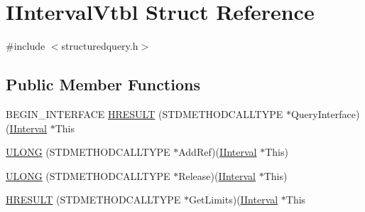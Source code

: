 \hypertarget{struct_i_interval_vtbl}{}\section{I\+Interval\+Vtbl Struct Reference}
\label{struct_i_interval_vtbl}


{\ttfamily \#include $<$structuredquery.\+h$>$}

\subsection*{Public Member Functions}
\begin{DoxyCompactItemize}
\item 
B\+E\+G\+I\+N\+\_\+\+I\+N\+T\+E\+R\+F\+A\+CE \hyperlink{struct_i_interval_vtbl_ae5284e6483cc05e5278e402f5e9ebbb3}{H\+R\+E\+S\+U\+LT} (S\+T\+D\+M\+E\+T\+H\+O\+D\+C\+A\+L\+L\+T\+Y\+PE $\ast$Query\+Interface)(\hyperlink{structuredquery_8h_a0bf098cafe33ebeb06adb20e72b66f27}{I\+Interval} $\ast$This
\item 
\hyperlink{struct_i_interval_vtbl_a5d4627fb8520858570ead80913ca73af}{U\+L\+O\+NG} (S\+T\+D\+M\+E\+T\+H\+O\+D\+C\+A\+L\+L\+T\+Y\+PE $\ast$Add\+Ref)(\hyperlink{structuredquery_8h_a0bf098cafe33ebeb06adb20e72b66f27}{I\+Interval} $\ast$This)
\item 
\hyperlink{struct_i_interval_vtbl_a601f17fa11b1a2e2bdaf538de2699541}{U\+L\+O\+NG} (S\+T\+D\+M\+E\+T\+H\+O\+D\+C\+A\+L\+L\+T\+Y\+PE $\ast$Release)(\hyperlink{structuredquery_8h_a0bf098cafe33ebeb06adb20e72b66f27}{I\+Interval} $\ast$This)
\item 
\hyperlink{struct_i_interval_vtbl_ac311f40b17c6689912611a3eec6d212f}{H\+R\+E\+S\+U\+LT} (S\+T\+D\+M\+E\+T\+H\+O\+D\+C\+A\+L\+L\+T\+Y\+PE $\ast$Get\+Limits)(\hyperlink{structuredquery_8h_a0bf098cafe33ebeb06adb20e72b66f27}{I\+Interval} $\ast$This
\end{DoxyCompactItemize}
